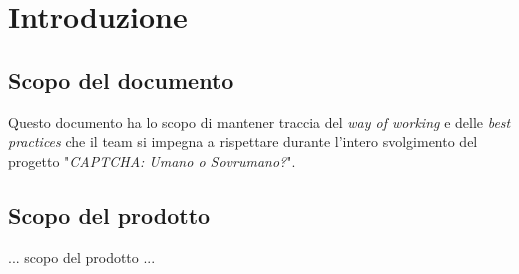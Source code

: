 \section{Introduzione}

\subsection{Scopo del documento}
Questo documento ha lo scopo di mantener traccia del \textit{way of working} 
e delle \textit{best practices} che il team si impegna a rispettare durante 
l'intero svolgimento del progetto "\textit{CAPTCHA: Umano o Sovrumano?}".

\subsection{Scopo del prodotto}
... scopo del prodotto ...
